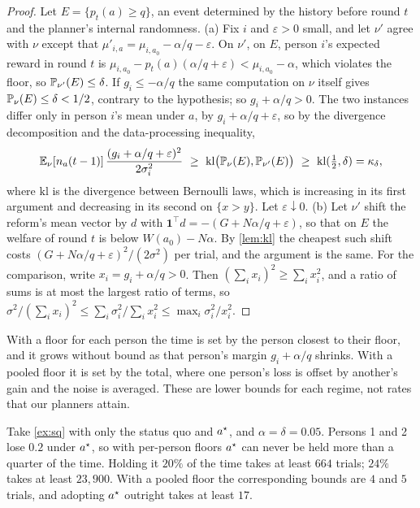 \begin{proof}
Let $E=\{p_t(a)\ge q\}$, an event determined by the history before round $t$ and the planner's internal randomness. (a) Fix $i$ and $\varepsilon>0$ small, and let $\nu'$ agree with $\nu$ except that $\mu'_{i,a}=\mu_{i,a_0}-\alpha/q-\varepsilon$. On $\nu'$, on $E$, person $i$'s expected reward in round $t$ is $\mu_{i,a_0}-p_t(a)(\alpha/q+\varepsilon)<\mu_{i,a_0}-\alpha$, which violates the floor, so $\mathbb{P}_{\nu'}(E)\le\delta$. If $g_i\le-\alpha/q$ the same computation on $\nu$ itself gives $\mathbb{P}_\nu(E)\le\delta<1/2$, contrary to the hypothesis; so $g_i+\alpha/q>0$. The two instances differ only in person $i$'s mean under $a$, by $g_i+\alpha/q+\varepsilon$, so by the divergence decomposition and the data-processing inequality,
\[
  \E_\nu[n_a(t-1)]\,\frac{(g_i+\alpha/q+\varepsilon)^2}{2\sigma_i^2}\ \ge\ \mathrm{kl}\big(\Prob_\nu(E),\Prob_{\nu'}(E)\big)\ \ge\ \mathrm{kl}(\tfrac12,\delta)=\kappa_\delta,
\]
where $\mathrm{kl}$ is the divergence between Bernoulli laws, which is increasing in its first argument and decreasing in its second on $\{x>y\}$. Let $\varepsilon\downarrow0$. (b) Let $\nu'$ shift the reform's mean vector by $d$ with $\mathbf 1^\top d=-(G+N\alpha/q+\varepsilon)$, so that on $E$ the welfare of round $t$ is below $W(a_0)-N\alpha$. By \cref{lem:kl} the cheapest such shift costs $(G+N\alpha/q+\varepsilon)^2/(2\sigma^2)$ per trial, and the argument is the same. For the comparison, write $x_i=g_i+\alpha/q>0$. Then $(\sum_ix_i)^2\ge\sum_ix_i^2$, and a ratio of sums is at most the largest ratio of terms, so $\sigma^2/(\sum_ix_i)^2\le\sum_i\sigma_i^2/\sum_ix_i^2\le\max_i\sigma_i^2/x_i^2$.
\end{proof}

With a floor for each person the time is set by the person closest to their floor, and it grows without bound as that person's margin $g_i+\alpha/q$ shrinks. With a pooled floor it is set by the total, where one person's loss is offset by another's gain and the noise is averaged. These are lower bounds for each regime, not rates that our planners attain.

Take \cref{ex:sq} with only the status quo and $a^\star$, and $\alpha=\delta=0.05$. Persons 1 and 2 lose $0.2$ under $a^\star$, so with per-person floors $a^\star$ can never be held more than a quarter of the time. Holding it $20\%$ of the time takes at least $664$ trials; $24\%$ takes at least $23{,}900$. With a pooled floor the corresponding bounds are $4$ and $5$ trials, and adopting $a^\star$ outright takes at least $17$.

